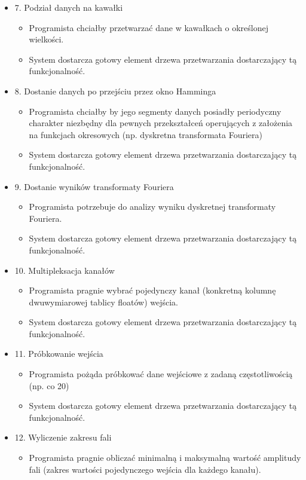 \begin{itemize}
	\item 7. Podział danych na kawałki
	\begin{itemize}
		\item Programista chciałby przetwarzać dane w kawałkach o określonej wielkości.
		\item System dostarcza gotowy element drzewa przetwarzania dostarczający tą funkcjonalność.
	\end{itemize}
	\item 8. Dostanie danych po przejściu przez okno Hamminga
	\begin{itemize}
		\item Programista chciałby by jego segmenty danych posiadły periodyczny charakter niezbędny dla pewnych przekształceń operujących z założenia na funkcjach okresowych (np. dyskretna transformata Fouriera)
		\item System dostarcza gotowy element drzewa przetwarzania dostarczający tą funkcjonalność.
	\end{itemize}
	\item 9. Dostanie wyników transformaty Fouriera
	\begin{itemize}
		\item Programista potrzebuje do analizy wyniku dyskretnej transformaty Fouriera.
		\item System dostarcza gotowy element drzewa przetwarzania dostarczający tą funkcjonalność.
	\end{itemize}
	\item 10. Multipleksacja kanałów
	\begin{itemize}
		\item Programista pragnie wybrać pojedynczy kanał (konkretną kolumnę dwuwymiarowej tablicy floatów) wejścia.
		\item System dostarcza gotowy element drzewa przetwarzania dostarczający tą funkcjonalność.
	\end{itemize}
	\item 11. Próbkowanie wejścia
	\begin{itemize}
		\item Programista pożąda próbkować dane wejściowe z zadaną częstotliwością (np. co 20)
		\item System dostarcza gotowy element drzewa przetwarzania dostarczający tą funkcjonalność.
	\end{itemize}
	\item 12. Wyliczenie zakresu fali
	\begin{itemize}
		\item Programista pragnie obliczać minimalną i maksymalną wartość amplitudy fali (zakres wartości pojedynczego wejścia dla każdego kanału).

\end{itemize}
\end{itemize}
